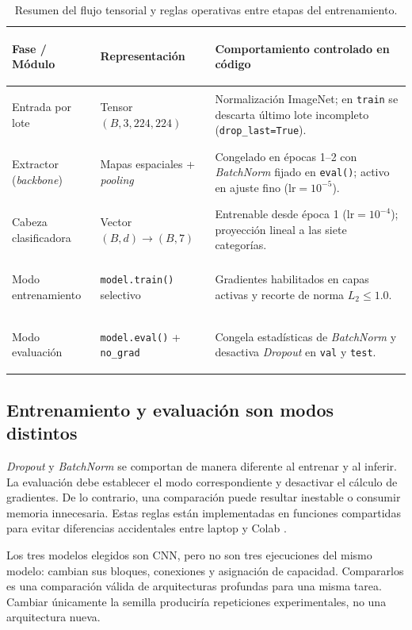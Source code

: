 \begin{table}[htbp]\centering\small
\caption{Resumen del flujo tensorial y reglas operativas entre etapas del entrenamiento.}
\begin{tabularx}{\textwidth}{@{}>{\bfseries\raggedright\arraybackslash}p{3.6cm}>{\raggedright\arraybackslash}p{4.3cm}>{\raggedright\arraybackslash}X@{}}
\toprule
\textbf{Fase / Módulo} & \textbf{Representación} & \textbf{Comportamiento controlado en código} \\ \midrule
Entrada por lote & Tensor $(B, 3, 224, 224)$ & Normalización ImageNet; en \texttt{train} se descarta último lote incompleto (\texttt{drop\_last=True}). \\
Extractor (\textit{backbone}) & Mapas espaciales + \textit{pooling} & Congelado en épocas 1--2 con \textit{BatchNorm} fijado en \texttt{eval()}; activo en ajuste fino ($\mathrm{lr}=10^{-5}$). \\
Cabeza clasificadora & Vector $(B, d) \to (B, 7)$ & Entrenable desde época 1 ($\mathrm{lr}=10^{-4}$); proyección lineal a las siete categorías. \\
Modo entrenamiento & \texttt{model.train()} selectivo & Gradientes habilitados en capas activas y recorte de norma $L_2 \le 1.0$. \\
Modo evaluación & \texttt{model.eval()} + \texttt{no\_grad} & Congela estadísticas de \textit{BatchNorm} y desactiva \textit{Dropout} en \texttt{val} y \texttt{test}. \\
\bottomrule
\end{tabularx}
\end{table}

\subsection{Entrenamiento y evaluación son modos distintos}
\textit{Dropout} y \textit{BatchNorm} se comportan de manera diferente al entrenar y al inferir. La evaluación debe establecer el modo correspondiente y desactivar el cálculo de gradientes. De lo contrario, una comparación puede resultar inestable o consumir memoria innecesaria. Estas reglas están implementadas en funciones compartidas para evitar diferencias accidentales entre laptop y Colab \cite{pytorch2019,torchvisiondocs}.

Los tres modelos elegidos son CNN, pero no son tres ejecuciones del mismo modelo: cambian sus bloques, conexiones y asignación de capacidad. Compararlos es una comparación válida de arquitecturas profundas para una misma tarea. Cambiar únicamente la semilla produciría repeticiones experimentales, no una arquitectura nueva.
